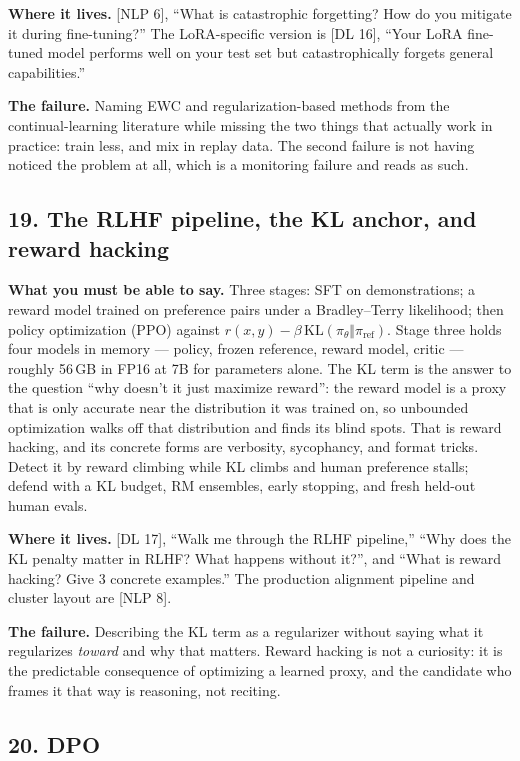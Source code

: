 \textbf{Where it lives.} [NLP 6], ``What is catastrophic forgetting? How do you mitigate it during fine-tuning?'' The LoRA-specific version is [DL 16], ``Your LoRA fine-tuned model performs well on your test set but catastrophically forgets general capabilities.''

\textbf{The failure.} Naming EWC and regularization-based methods from the continual-learning literature while missing the two things that actually work in practice: train less, and mix in replay data. The second failure is not having noticed the problem at all, which is a monitoring failure and reads as such.

\subsection*{19. The RLHF pipeline, the KL anchor, and reward hacking}

\textbf{What you must be able to say.} Three stages: SFT on demonstrations; a reward model trained on preference pairs under a Bradley--Terry likelihood; then policy optimization (PPO) against $r(x,y) - \beta\,\mathrm{KL}(\pi_\theta \Vert \pi_{\text{ref}})$. Stage three holds four models in memory --- policy, frozen reference, reward model, critic --- roughly 56\,GB in FP16 at 7B for parameters alone. The KL term is the answer to the question ``why doesn't it just maximize reward'': the reward model is a proxy that is only accurate near the distribution it was trained on, so unbounded optimization walks off that distribution and finds its blind spots. That is reward hacking, and its concrete forms are verbosity, sycophancy, and format tricks. Detect it by reward climbing while KL climbs and human preference stalls; defend with a KL budget, RM ensembles, early stopping, and fresh held-out human evals.

\textbf{Where it lives.} [DL 17], ``Walk me through the RLHF pipeline,'' ``Why does the KL penalty matter in RLHF? What happens without it?'', and ``What is reward hacking? Give 3 concrete examples.'' The production alignment pipeline and cluster layout are [NLP 8].

\textbf{The failure.} Describing the KL term as a regularizer without saying what it regularizes \emph{toward} and why that matters. Reward hacking is not a curiosity: it is the predictable consequence of optimizing a learned proxy, and the candidate who frames it that way is reasoning, not reciting.

\subsection*{20. DPO}

